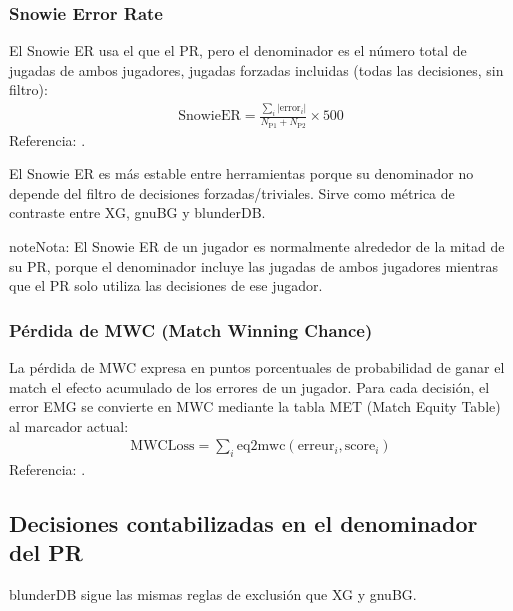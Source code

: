 \documentclass[letterpaper,10pt,spanish]{sphinxmanual}
\begin{document}
\subsubsection{Snowie Error Rate}
\label{\detokenize{stats_parity:snowie-error-rate}}
\sphinxAtStartPar
El Snowie ER usa el  que el PR, pero el denominador es el número total de jugadas de ambos jugadores, jugadas forzadas incluidas (todas las decisiones, sin filtro):
\begin{equation*}
\begin{split}\mathrm{SnowieER} = \frac{\sum_i |\mathrm{error}_i|}{N_\text{P1} + N_\text{P2}} \times 500\end{split}
\end{equation*}
\sphinxAtStartPar
Referencia: .

\sphinxAtStartPar
El Snowie ER es más estable entre herramientas porque su denominador no depende del filtro de decisiones forzadas/triviales. Sirve como métrica de contraste entre XG, gnuBG y blunderDB.

\begin{sphinxadmonition}{note}{Nota:}
\sphinxAtStartPar
El Snowie ER de un jugador es normalmente alrededor de la mitad de su PR, porque el denominador incluye las jugadas de ambos jugadores mientras que el PR solo utiliza las decisiones de ese jugador.
\end{sphinxadmonition}


\subsubsection{Pérdida de MWC (Match Winning Chance)}
\label{\detokenize{stats_parity:perte-mwc-match-winning-chance}}
\sphinxAtStartPar
La pérdida de MWC expresa en puntos porcentuales de probabilidad de ganar el match el efecto acumulado de los errores de un jugador. Para cada decisión, el error EMG se convierte en MWC mediante la tabla MET (Match Equity Table) al marcador actual:
\begin{equation*}
\begin{split}\mathrm{MWCLoss} = \sum_i \mathrm{eq2mwc}(\mathrm{erreur}_i, \mathrm{score}_i)\end{split}
\end{equation*}
\sphinxAtStartPar
Referencia: .


\subsection{Decisiones contabilizadas en el denominador del PR}
\label{\detokenize{stats_parity:decisions-comptees-au-denominateur-du-pr}}
\sphinxAtStartPar
blunderDB sigue las mismas reglas de exclusión que XG y gnuBG.
\end{document}
